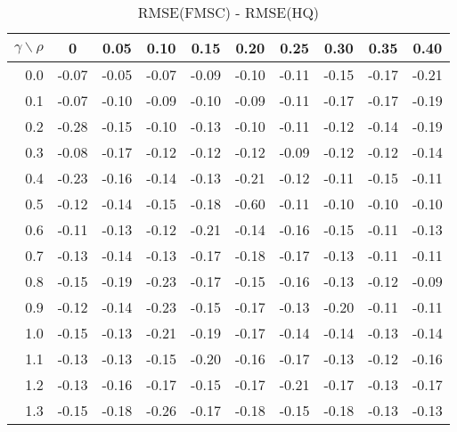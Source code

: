 \documentclass[12pt]{article}
\begin{document}
%
\begin{table}[!tbp]
\caption{RMSE(FMSC) - RMSE(HQ)}
 \begin{center}
 \begin{tabular}{r|rrrrrrrrr}\hline\hline
\multicolumn{1}{c|}{$\gamma\backslash\rho$}&\multicolumn{1}{c}{0}&\multicolumn{1}{c}{0.05}&\multicolumn{1}{c}{0.10}&\multicolumn{1}{c}{0.15}&\multicolumn{1}{c}{0.20}&\multicolumn{1}{c}{0.25}&\multicolumn{1}{c}{0.30}&\multicolumn{1}{c}{0.35}&\multicolumn{1}{c}{0.40}\tabularnewline
\hline

0.0&-0.07&-0.05&-0.07&-0.09&-0.10&-0.11&-0.15&-0.17&-0.21\tabularnewline
0.1&-0.07&-0.10&-0.09&-0.10&-0.09&-0.11&-0.17&-0.17&-0.19\tabularnewline
0.2&-0.28&-0.15&-0.10&-0.13&-0.10&-0.11&-0.12&-0.14&-0.19\tabularnewline
0.3&-0.08&-0.17&-0.12&-0.12&-0.12&-0.09&-0.12&-0.12&-0.14\tabularnewline
0.4&-0.23&-0.16&-0.14&-0.13&-0.21&-0.12&-0.11&-0.15&-0.11\tabularnewline
0.5&-0.12&-0.14&-0.15&-0.18&-0.60&-0.11&-0.10&-0.10&-0.10\tabularnewline
0.6&-0.11&-0.13&-0.12&-0.21&-0.14&-0.16&-0.15&-0.11&-0.13\tabularnewline
0.7&-0.13&-0.14&-0.13&-0.17&-0.18&-0.17&-0.13&-0.11&-0.11\tabularnewline
0.8&-0.15&-0.19&-0.23&-0.17&-0.15&-0.16&-0.13&-0.12&-0.09\tabularnewline
0.9&-0.12&-0.14&-0.23&-0.15&-0.17&-0.13&-0.20&-0.11&-0.11\tabularnewline
1.0&-0.15&-0.13&-0.21&-0.19&-0.17&-0.14&-0.14&-0.13&-0.14\tabularnewline
1.1&-0.13&-0.13&-0.15&-0.20&-0.16&-0.17&-0.13&-0.12&-0.16\tabularnewline
1.2&-0.13&-0.16&-0.17&-0.15&-0.17&-0.21&-0.17&-0.13&-0.17\tabularnewline
1.3&-0.15&-0.18&-0.26&-0.17&-0.18&-0.15&-0.18&-0.13&-0.13\tabularnewline
\hline
\end{tabular}

\end{center}

\end{table}
\end{document}
